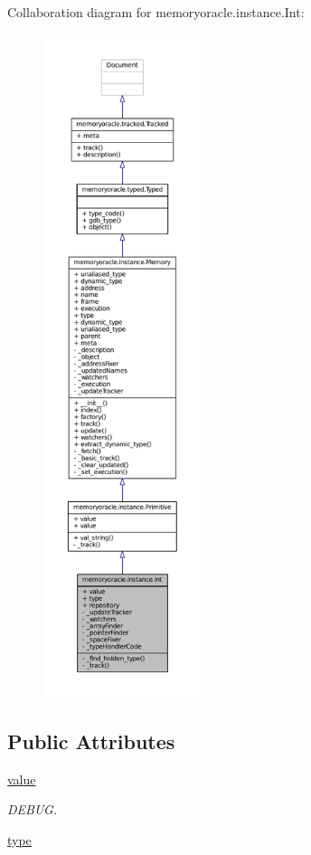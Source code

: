 Collaboration diagram for memoryoracle.\+instance.\+Int\+:
\nopagebreak
\begin{figure}[H]
\begin{center}
\leavevmode
\includegraphics[height=550pt]{classmemoryoracle_1_1instance_1_1Int__coll__graph}
\end{center}
\end{figure}
\subsection*{Public Attributes}
\begin{DoxyCompactItemize}
\item 
\hyperlink{classmemoryoracle_1_1instance_1_1Int_a1aa7dad36f0713d9c4775562cd74efc8}{value}
\begin{DoxyCompactList}\small\item\em D\+E\+B\+U\+G. \end{DoxyCompactList}\item 
\hyperlink{classmemoryoracle_1_1instance_1_1Int_a5c870c1de0a0c49600e25d801c410d51}{type}
\end{DoxyCompactItemize}
